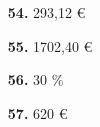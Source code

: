 \documentclass[a4paper, pdf, twoside]{book}
\begin{document}
\begin{multicols}{2}
\begin{enumerate}
\vspace{0.25cm}
\item[\fontfamily{phv}\selectfont\color{blue}\textbf{54. }] 
293,12 \euro {}
\vspace{0.25cm}
\item[\fontfamily{phv}\selectfont\color{blue}\textbf{55. }] 
1702,40 \euro {}
\vspace{0.25cm}
\item[\fontfamily{phv}\selectfont\color{blue}\textbf{56. }] 
30 \%
\vspace{0.25cm}
\item[\fontfamily{phv}\selectfont\color{blue}\textbf{57. }] 
620 \euro {}
 \end{enumerate}
\vspace{0.3cm}



\end{multicols}
\end{document}

